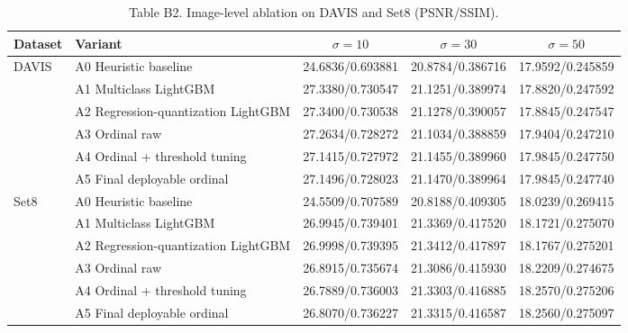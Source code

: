 \begin{table}[t]
\centering
\caption{Table B2. Image-level ablation on DAVIS and Set8 (PSNR/SSIM).}
\label{tab:b2_ablation_image}
\setlength{\tabcolsep}{4pt}
\begin{tabular}{llccc}
\toprule
Dataset & Variant & $\sigma=10$ & $\sigma=30$ & $\sigma=50$ \\
\midrule
\multirow{6}{*}{DAVIS} & A0 Heuristic baseline & 24.6836/0.693881 & 20.8784/0.386716 & 17.9592/0.245859 \\
 & A1 Multiclass LightGBM & 27.3380/0.730547 & 21.1251/0.389974 & 17.8820/0.247592 \\
 & A2 Regression-quantization LightGBM & 27.3400/0.730538 & 21.1278/0.390057 & 17.8845/0.247547 \\
 & A3 Ordinal raw & 27.2634/0.728272 & 21.1034/0.388859 & 17.9404/0.247210 \\
 & A4 Ordinal + threshold tuning & 27.1415/0.727972 & 21.1455/0.389960 & 17.9845/0.247750 \\
 & A5 Final deployable ordinal & 27.1496/0.728023 & 21.1470/0.389964 & 17.9845/0.247740 \\
\midrule
\multirow{6}{*}{Set8} & A0 Heuristic baseline & 24.5509/0.707589 & 20.8188/0.409305 & 18.0239/0.269415 \\
 & A1 Multiclass LightGBM & 26.9945/0.739401 & 21.3369/0.417520 & 18.1721/0.275070 \\
 & A2 Regression-quantization LightGBM & 26.9998/0.739395 & 21.3412/0.417897 & 18.1767/0.275201 \\
 & A3 Ordinal raw & 26.8915/0.735674 & 21.3086/0.415930 & 18.2209/0.274675 \\
 & A4 Ordinal + threshold tuning & 26.7889/0.736003 & 21.3303/0.416885 & 18.2570/0.275206 \\
 & A5 Final deployable ordinal & 26.8070/0.736227 & 21.3315/0.416587 & 18.2560/0.275097 \\
\bottomrule
\end{tabular}
\end{table}
